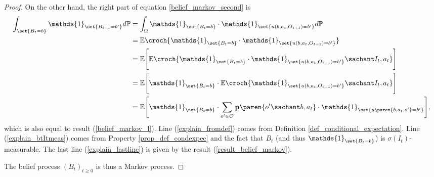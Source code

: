 \begin{proof}
On the other hand, the right part of equation \ref{belief_markov_second} is
\begin{align} 
\nonumber \int_{ \set{B_t = b} } \mathds{1}_{\set{ B_{t+1} = b'}}  d \mathbb{P} &= \int_{ \Omega} \mathds{1}_{\set{B_t = b} } \cdot \mathds{1}_{\set{ u(b,a_t,O_{t+1}) = b'}}  d \mathbb{P}  \\
\nonumber &= \mathbb{E} \croch{ \mathds{1}_{\set{B_t = b} } \cdot \mathds{1}_{\set{ u(b,a_t,O_{t+1}) = b'}} }\\
\label{explain_fromdef} &= \mathbb{E} \Bigg[ \mathbb{E} \croch{ \mathds{1}_{\set{B_t = b} } \cdot \mathds{1}_{\set{ u(b,a_t,O_{t+1}) = b'}} \sachant I_t, a_t } \Bigg]\\
\label{explain_btItmeas} &= \mathbb{E} \Bigg[ \mathds{1}_{\set{B_t = b} } \cdot \mathbb{E} \croch{  \mathds{1}_{\set{ u(b,a_t,O_{t+1}) = b'}} \sachant I_t, a_t } \Bigg]\\
\label{explain_lastline} &= \mathbb{E} \Bigg[ \mathds{1}_{\set{B_t = b} } \cdot \sum_{o' \in \mathcal{O}} \textbf{p} \paren{ o' \sachant b, a_t } \cdot \mathds{1}_{ \set{ u \paren{ b, a_t, o'} = b'} } \Bigg],
\end{align}
which is also equal to result (\ref{belief_markov_l}).
Line (\ref{explain_fromdef}) comes from Definition \ref{def_conditional_expectation}.
Line (\ref{explain_btItmeas}) comes from Property \ref{prop_def_condexpec} 
and the fact that $B_t$ (and thus $\mathds{1}_{\set{B_t = b}}$) is $\sigma(I_t)$-measurable.
The last line (\ref{explain_lastline}) is given by the result (\ref{result_belief_markov}).

The belief process $(B_t)_{t \geqslant 0}$ is thus a Markov process.
\end{proof}












